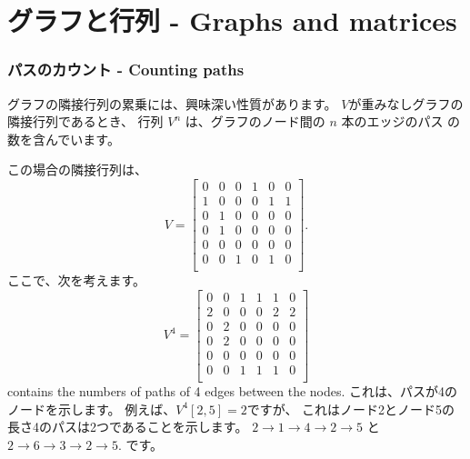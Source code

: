 \section{グラフと行列 - Graphs and matrices}

\subsubsection{パスのカウント - Counting paths}

グラフの隣接行列の累乗には、興味深い性質があります。
$V$が重みなしグラフの隣接行列であるとき、
行列 $V^n$ は、グラフのノード間の $n$ 本のエッジのパス の数を含んでいます。

\begin{center}
\end{center}
この場合の隣接行列は、
\[
V= \begin{bmatrix}
  0 & 0 & 0 & 1 & 0 & 0 \\
  1 & 0 & 0 & 0 & 1 & 1 \\
  0 & 1 & 0 & 0 & 0 & 0 \\
  0 & 1 & 0 & 0 & 0 & 0 \\
  0 & 0 & 0 & 0 & 0 & 0 \\
  0 & 0 & 1 & 0 & 1 & 0 \\
 \end{bmatrix}.
\]
ここで、次を考えます。
\[
V^4= \begin{bmatrix}
  0 & 0 & 1 & 1 & 1 & 0 \\
  2 & 0 & 0 & 0 & 2 & 2 \\
  0 & 2 & 0 & 0 & 0 & 0 \\
  0 & 2 & 0 & 0 & 0 & 0 \\
  0 & 0 & 0 & 0 & 0 & 0 \\
  0 & 0 & 1 & 1 & 1 & 0 \\
 \end{bmatrix}
\]
contains the numbers of paths of 4 edges
between the nodes.
これは、パスが4のノードを示します。
例えば、$V^4[2,5]=2$ですが、
これはノード2とノード5の長さ4のパスは2つであることを示します。
$2 \rightarrow 1 \rightarrow 4 \rightarrow 2 \rightarrow 5$
と
$2 \rightarrow 6 \rightarrow 3 \rightarrow 2 \rightarrow 5$.
です。

